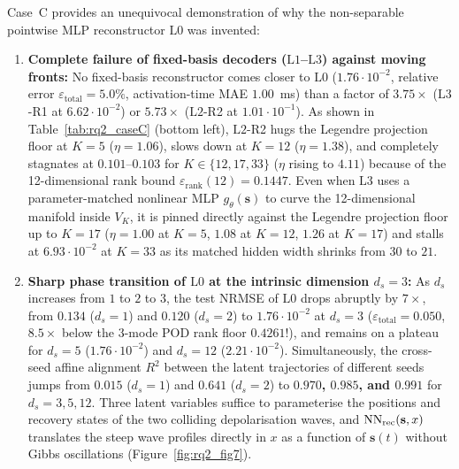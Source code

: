Case~C provides an unequivocal demonstration of why the non-separable pointwise MLP reconstructor $\mathrm{L0}$ was invented:
\begin{enumerate}[leftmargin=2em]
  \item \textbf{Complete failure of fixed-basis decoders ($\mathrm{L1}$--$\mathrm{L3}$) against moving fronts:} No fixed-basis reconstructor comes closer to $\mathrm{L0}$ ($1.76\cdot 10^{-2}$, relative error $\varepsilon_{\mathrm{total}} = 5.0\%$, activation-time MAE $1.00$~ms) than a factor of \textbf{$3.75\times$} ($\mathrm{L3}$-R1 at $6.62\cdot 10^{-2}$) or \textbf{$5.73\times$} ($\mathrm{L2}$-R2 at $1.01\cdot 10^{-1}$). As shown in Table~\ref{tab:rq2_caseC} (bottom left), $\mathrm{L2}$-R2 hugs the Legendre projection floor at $K=5$ ($\eta = 1.06$), slows down at $K=12$ ($\eta = 1.38$), and completely stagnates at $0.101$--$0.103$ for $K \in \{12, 17, 33\}$ ($\eta$ rising to $4.11$) because of the 12-dimensional rank bound $\varepsilon_{\mathrm{rank}}(12) = 0.1447$. Even when $\mathrm{L3}$ uses a parameter-matched nonlinear MLP $g_\theta(\mathbf{s})$ to curve the 12-dimensional manifold inside $V_K$, it is pinned directly against the Legendre projection floor up to $K=17$ ($\eta = 1.00$ at $K=5$, $1.08$ at $K=12$, $1.26$ at $K=17$) and stalls at $6.93\cdot 10^{-2}$ at $K=33$ as its matched hidden width shrinks from $30$ to $21$.
  \item \textbf{Sharp phase transition of $\mathrm{L0}$ at the intrinsic dimension $d_s = 3$:} As $d_s$ increases from $1$ to $2$ to $3$, the test NRMSE of $\mathrm{L0}$ drops abruptly by \textbf{$7\times$}, from $0.134$ ($d_s=1$) and $0.120$ ($d_s=2$) to \textbf{$1.76\cdot 10^{-2}$} at $d_s=3$ ($\varepsilon_{\mathrm{total}} = 0.050$, $8.5\times$ below the 3-mode POD rank floor $0.4261$!), and remains on a plateau for $d_s = 5$ ($1.76\cdot 10^{-2}$) and $d_s = 12$ ($2.21\cdot 10^{-2}$). Simultaneously, the cross-seed affine alignment $R^2$ between the latent trajectories of different seeds jumps from $0.015$ ($d_s=1$) and $0.641$ ($d_s=2$) to \textbf{$0.970$, $0.985$, and $0.991$} for $d_s = 3, 5, 12$. Three latent variables suffice to parameterise the positions and recovery states of the two colliding depolarisation waves, and $\mathrm{NN}_{\mathrm{rec}}(\mathbf{s},x)$ translates the steep wave profiles directly in $x$ as a function of $\mathbf{s}(t)$ without Gibbs oscillations (Figure~\ref{fig:rq2_fig7}).
\end{enumerate}

